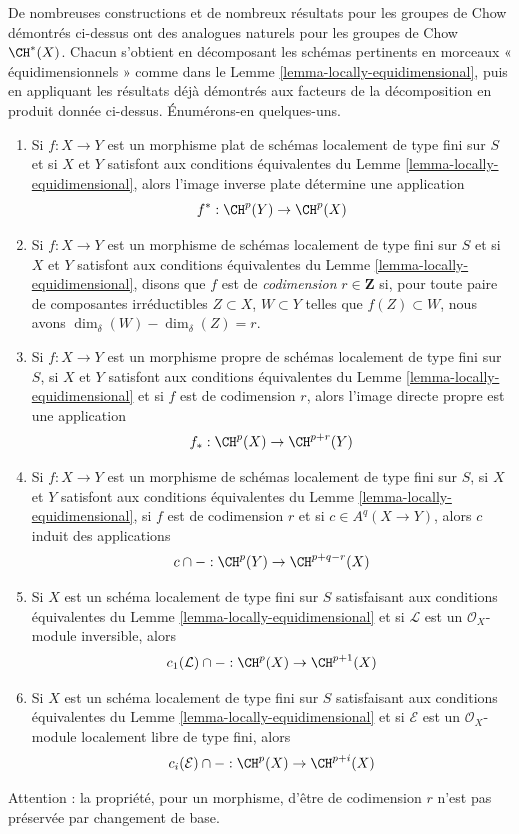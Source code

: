 \medskip\noindent
De nombreuses constructions et de nombreux résultats pour les groupes de Chow démontrés ci-dessus ont
des analogues naturels pour les groupes de Chow $\CH^*(X)$. Chacun s'obtient
en décomposant les schémas pertinents en morceaux « équidimensionnels »
comme dans le Lemme \ref{lemma-locally-equidimensional},
puis en appliquant les résultats déjà démontrés aux
facteurs de la décomposition en produit donnée ci-dessus.
Énumérons-en quelques-uns.
\begin{enumerate}
\item Si $f : X \to Y$ est un morphisme plat de schémas localement de type fini
sur $S$ et si $X$ et $Y$ satisfont aux conditions équivalentes du
Lemme \ref{lemma-locally-equidimensional}, alors l'image inverse plate détermine une application
$$
f^* : \CH^p(Y) \to \CH^p(X)
$$
\item Si $f : X \to Y$ est un morphisme de schémas localement de type fini
sur $S$ et si $X$ et $Y$ satisfont aux conditions équivalentes du
Lemme \ref{lemma-locally-equidimensional}, disons que $f$ est de
{\it codimension} $r \in \mathbf{Z}$ si, pour toute paire de composantes irréductibles
$Z \subset X$, $W \subset Y$ telles que $f(Z) \subset W$, nous avons
$\dim_\delta(W) - \dim_\delta(Z) = r$.
\item Si $f : X \to Y$ est un morphisme propre de schémas localement de type fini
sur $S$, si $X$ et $Y$ satisfont aux conditions équivalentes du
Lemme \ref{lemma-locally-equidimensional} et si $f$ est de codimension $r$,
alors l'image directe propre est une application
$$
f_* : \CH^p(X) \to \CH^{p + r}(Y)
$$
\item Si $f : X \to Y$ est un morphisme de schémas localement de type fini sur $S$,
si $X$ et $Y$ satisfont aux conditions équivalentes du
Lemme \ref{lemma-locally-equidimensional}, si $f$ est de codimension $r$
et si $c \in A^q(X \to Y)$, alors $c$ induit des applications
$$
c \cap -  : \CH^p(Y) \to \CH^{p + q - r}(X)
$$
\item Si $X$ est un schéma localement de type fini sur $S$
satisfaisant aux conditions équivalentes du
Lemme \ref{lemma-locally-equidimensional} et si
$\mathcal{L}$ est un $\mathcal{O}_X$-module inversible,
alors
$$
c_1(\mathcal{L}) \cap - : \CH^p(X) \to \CH^{p + 1}(X)
$$
\item Si $X$ est un schéma localement de type fini sur $S$
satisfaisant aux conditions équivalentes du
Lemme \ref{lemma-locally-equidimensional} et si
$\mathcal{E}$ est un $\mathcal{O}_X$-module localement libre de type fini,
alors
$$
c_i(\mathcal{E}) \cap - : \CH^p(X) \to \CH^{p + i}(X)
$$
\end{enumerate}
Attention : la propriété, pour un morphisme, d'être de codimension $r$
n'est pas préservée par changement de base.

